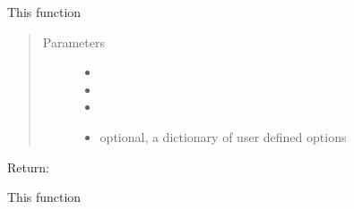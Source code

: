 \documentclass[letterpaper,10pt,english,openany,oneside]{sphinxmanual}
\begin{document}
\begin{fulllineitems}
\begin{fulllineitems}
\begin{quote}
\begin{description}
\end{description}\end{quote}

\end{fulllineitems}


\begin{fulllineitems}
\label{\detokenize{nloed:nloed.model.Model.predict}}
This function
\begin{quote}\begin{description}
\item[{Parameters}] \leavevmode\begin{itemize}
\item {} 
 \textendash{} 

\item {} 
 \textendash{} 

\item {} 
 \textendash{} 

\item {} 
 \textendash{} optional,  a dictionary of user defined options

\end{itemize}

\end{description}\end{quote}

Return:

\end{fulllineitems}


\begin{fulllineitems}
\label{\detokenize{nloed:nloed.model.Model.evaluate}}
This function


\end{fulllineitems}
\end{fulllineitems}
\end{document}
